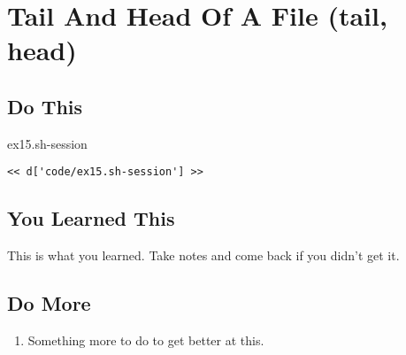 \chapter{Tail And Head Of A File (tail, head)}

\section{Do This}

\begin{code}{ex15.sh-session}
\begin{Verbatim}
<< d['code/ex15.sh-session'] >>
\end{Verbatim}
\end{code}


\section{You Learned This}

This is what you learned.  Take notes and come back if you didn't get it.

\section{Do More}

\begin{enumerate}
\item Something more to do to get better at this.
\end{enumerate}

